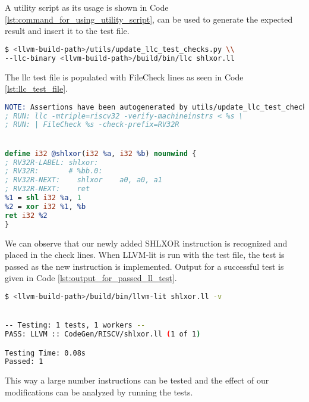 A utility script as its usage is shown in Code \ref{lst:command_for_using_utility_script}, can be used to generate the expected result and insert it to the test file.

\begin{lstlisting}[language=sh, caption={Command for using utility script}, label={lst:command_for_using_utility_script} ]
$ <llvm-build-path>/utils/update_llc_test_checks.py \\
--llc-binary <llvm-build-path>/build/bin/llc shlxor.ll
\end{lstlisting}

The llc test file is populated with FileCheck lines as seen in Code \ref{lst:llc_test_file}.

\begin{minipage}{\linewidth}
\begin{lstlisting}[language=llvm,style=nasm, caption={The final LLC test file}, label={lst:llc_test_file} ]
NOTE: Assertions have been autogenerated by utils/update_llc_test_checks.py
; RUN: llc -mtriple=riscv32 -verify-machineinstrs < %s \ 
; RUN: | FileCheck %s -check-prefix=RV32R 


define i32 @shlxor(i32 %a, i32 %b) nounwind { 
; RV32R-LABEL: shlxor:
; RV32R:       # %bb.0:
; RV32R-NEXT:    shlxor    a0, a0, a1
; RV32R-NEXT:    ret
%1 = shl i32 %a, 1 
%2 = xor i32 %1, %b 
ret i32 %2 
} 
\end{lstlisting}
\end{minipage}


We can observe that our newly added SHLXOR instruction is recognized and placed in the check lines. When LLVM-lit is run with the test file, the test is passed as the new instruction is implemented. Output for a successful test is given in Code \ref{lst:output_for_passed_ll_test}.

\begin{lstlisting}[language=sh, caption={Output for successfully passed test}, label={lst:output_for_passed_ll_test} ]
$ <llvm-build-path>/build/bin/llvm-lit shlxor.ll -v


-- Testing: 1 tests, 1 workers --
PASS: LLVM :: CodeGen/RISCV/shlxor.ll (1 of 1)

Testing Time: 0.08s
Passed: 1
\end{lstlisting}

This way a large number instructions can be tested and the effect of our modifications can be analyzed by running the tests.
